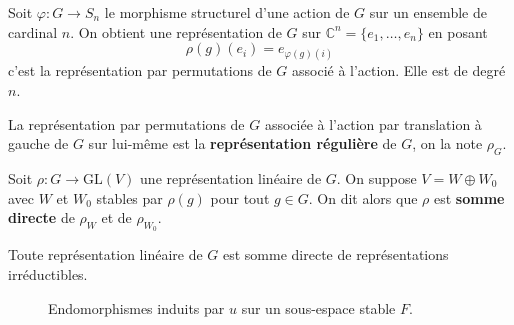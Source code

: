   \begin{example}
    Soit $\varphi : G \rightarrow S_n$ le morphisme structurel d'une action de $G$ sur un ensemble de cardinal $n$. On obtient une représentation de $G$ sur $\mathbb{C}^n = \{ e_1, \dots, e_n \}$ en posant
    \[ \rho(g)(e_i) = e_{\varphi(g)(i)} \]
    c'est la représentation par permutations de $G$ associé à l'action. Elle est de degré $n$.
  \end{example}

  \begin{definition}
    La représentation par permutations de $G$ associée à l'action par translation à gauche de $G$ sur lui-même est la \textbf{représentation régulière} de $G$, on la note $\rho_G$.
  \end{definition}

  \begin{definition}
    Soit $\rho : G \rightarrow \mathrm{GL}(V)$ une représentation linéaire de $G$. On suppose $V = W \oplus W_0$ avec $W$ et $W_0$ stables par $\rho(g)$ pour tout $g \in G$. On dit alors que $\rho$ est \textbf{somme directe} de $\rho_W$ et de $\rho_{W_0}$.
  \end{definition}

  \begin{theorem}[Maschke]
    Toute représentation linéaire de $G$ est somme directe de représentations irréductibles.
  \end{theorem}

  \annexessection


  \begin{figure}[h]
    \begin{center}
    \end{center}
    \caption{Endomorphismes induits par $u$ sur un sous-espace stable $F$.}
  \end{figure}

